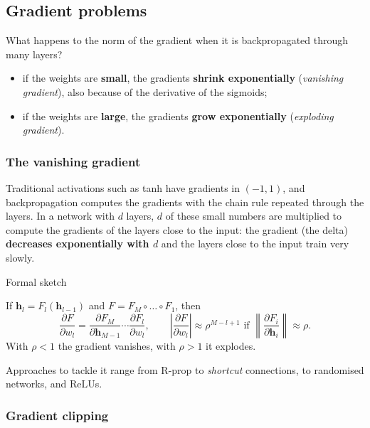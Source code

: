 \subsection{Gradient problems}\label{problemi-del-gradiente}

What happens to the norm of the gradient when it is backpropagated
through many layers?

\begin{itemize}
\tightlist
\item
  if the weights are \textbf{small}, the gradients \textbf{shrink
  exponentially} (\emph{vanishing gradient}), also because of the
  derivative of the sigmoids;
\item
  if the weights are \textbf{large}, the gradients \textbf{grow
  exponentially} (\emph{exploding gradient}).
\end{itemize}

\subsubsection{The vanishing gradient}\label{il-vanishing-gradient}

Traditional activations such as tanh have gradients in \((-1, 1)\), and
backpropagation computes the gradients with the chain rule repeated
through the layers. In a network with \(d\) layers, \(d\) of these
small numbers are multiplied to compute the gradients of the layers
close to the input: the gradient (the delta) \textbf{decreases
exponentially with \(d\)} and the layers close to the input train very
slowly.

\begin{boxnote}{Formal sketch}

If \(\mathbf{h}_l = F_l(\mathbf{h}_{l-1})\) and
\(F = F_M \circ \dots \circ F_1\), then \[
\frac{\partial F}{\partial w_l} = \frac{\partial F_M}{\partial \mathbf{h}_{M-1}}\cdots\frac{\partial F_l}{\partial w_l}, \qquad \left|\frac{\partial F}{\partial w_l}\right| \approx \rho^{M-l+1} \text{ if } \left\|\frac{\partial F_i}{\partial \mathbf{h}_i}\right\| \approx \rho.
\] With \(\rho < 1\) the gradient vanishes, with \(\rho > 1\) it
explodes.

\end{boxnote}

Approaches to tackle it range from R-prop to \emph{shortcut}
connections, to randomised networks, and ReLUs.

\subsubsection{Gradient clipping}\label{gradient-clipping}

